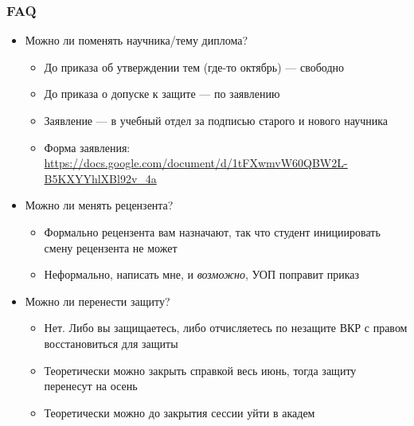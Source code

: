 \documentclass{../../slides-style}
\begin{document}
    \begin{frame}
        \frametitle{FAQ}
        \begin{itemize}
            \item Можно ли поменять научника/тему диплома?
            \begin{itemize}
                \item До приказа об утверждении тем (где-то октябрь) --- свободно
                \item До приказа о допуске к защите --- по заявлению 
                \item Заявление --- в учебный отдел за подписью старого и нового научника 
                \item Форма заявления: \url{https://docs.google.com/document/d/1tFXwmvW60QBW2L-B5KXYYhlXBl92v_4a}
            \end{itemize}
            \item Можно ли менять рецензента?
            \begin{itemize}
                \item Формально рецензента вам назначают, так что студент инициировать смену рецензента не может
                \item Неформально, написать мне, и \textit{возможно}, УОП поправит приказ
            \end{itemize}
            \item Можно ли перенести защиту?
            \begin{itemize}
                \item Нет. Либо вы защищаетесь, либо отчисляетесь по незащите ВКР с правом восстановиться для защиты
                \item Теоретически можно закрыть справкой весь июнь, тогда защиту перенесут на осень
                \item Теоретически можно до закрытия сессии уйти в академ
            \end{itemize}
        \end{itemize}
    \end{frame}
\end{document}
